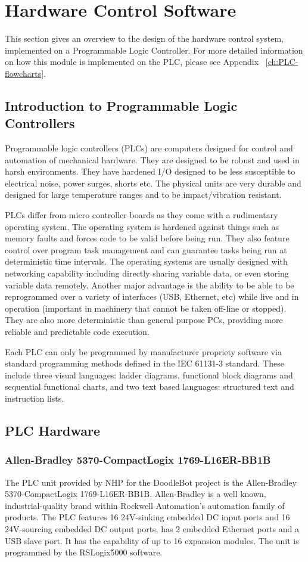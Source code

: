 \section{Hardware Control Software}

This section gives an overview to the design of the hardware control system, implemented on a Programmable Logic Controller. For more detailed information on how this module is implemented on the PLC, please see Appendix ~\ref{ch:PLC-flowcharts}.

\subsection{Introduction to Programmable Logic Controllers}
	Programmable logic controllers (PLCs) are computers designed for control and automation of mechanical hardware. They are designed to be robust and used in harsh environments. They have hardened I/O designed to be less susceptible to electrical noise, power surges, shorts etc. The physical units are very durable and designed for large temperature ranges and to be impact/vibration resistant.
	
	PLCs differ from micro controller boards as they come with a rudimentary operating system. The operating system is hardened against things such as memory faults and forces code to be valid before being run. They also feature control over program task management and can guarantee tasks being run at deterministic time intervals. The operating systems are usually designed with networking capability including directly sharing variable data, or even storing variable data remotely. Another major advantage is the ability to be able to be reprogrammed over a variety of interfaces (USB, Ethernet, etc) while live and in operation (important in machinery that cannot be taken off-line or stopped). They are also more deterministic than general purpose PCs, providing more reliable and predictable code execution.
	
	Each PLC can only be programmed by manufacturer propriety software via standard programming methods defined in the IEC 61131-3 standard. These include three visual languages: ladder diagrams, functional block diagrams and sequential functional charts, and two text based languages: structured text and instruction lists.
	
\subsection{PLC Hardware}
	\subsubsection{Allen-Bradley 5370-CompactLogix 1769-L16ER-BB1B}
		The PLC unit provided by NHP for the DoodleBot project is the Allen-Bradley 5370-CompactLogix 1769-L16ER-BB1B. Allen-Bradley is a well known, industrial-quality brand within Rockwell Automation's automation family of products. The PLC features 16 24V-sinking embedded DC input ports and 16 24V-sourcing embedded DC output ports, has 2 embedded Ethernet ports and a USB slave port. It has the capability of up to 16 expansion modules. The unit is programmed by the RSLogix5000 software.
